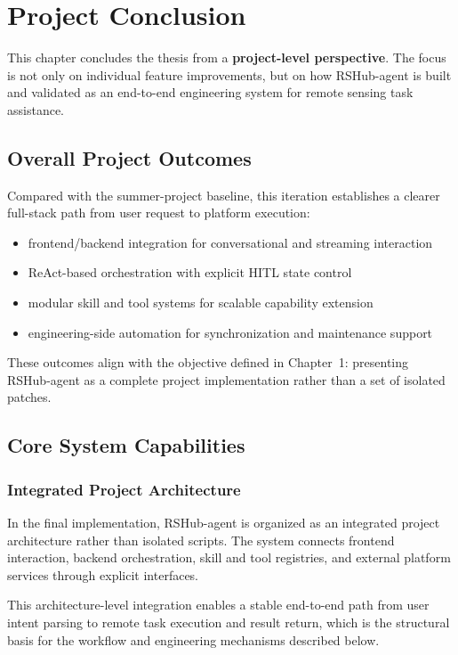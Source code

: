 \chapter{Project Conclusion}
\label{ch:conclusion}

This chapter concludes the thesis from a \textbf{project-level perspective}. The focus is not only on individual feature improvements, but on how RSHub-agent is built and validated as an end-to-end engineering system for remote sensing task assistance.

\section{Overall Project Outcomes}
Compared with the summer-project baseline, this iteration establishes a clearer full-stack path from user request to platform execution:
\begin{itemize}
	\item frontend/backend integration for conversational and streaming interaction
	\item ReAct-based orchestration with explicit HITL state control
	\item modular skill and tool systems for scalable capability extension
	\item engineering-side automation for synchronization and maintenance support
\end{itemize}

These outcomes align with the objective defined in Chapter~1: presenting RSHub-agent as a complete project implementation rather than a set of isolated patches.

\section{Core System Capabilities}

\subsection{Integrated Project Architecture}
In the final implementation, RSHub-agent is organized as an integrated project architecture rather than isolated scripts. The system connects frontend interaction, backend orchestration, skill and tool registries, and external platform services through explicit interfaces.

This architecture-level integration enables a stable end-to-end path from user intent parsing to remote task execution and result return, which is the structural basis for the workflow and engineering mechanisms described below.

